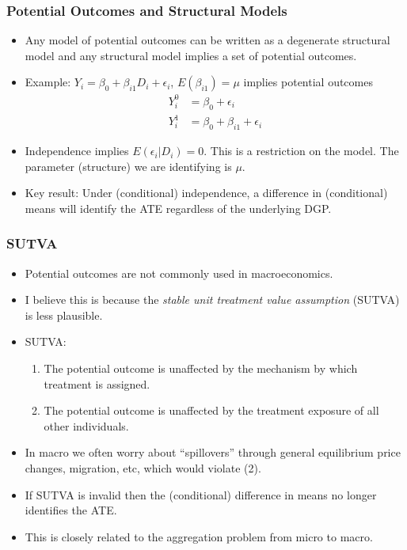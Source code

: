 \documentclass[english,xcolor=svgnames]{beamer}
\begin{document}
\begin{frame}
\frametitle[alignment=center]{Potential Outcomes and Structural Models}
\begin{itemize}
	\item Any model of potential outcomes can be written as a degenerate structural model and any structural model implies a set of potential outcomes.
	\item Example: $Y_i = \beta_0 + \beta_{i1} D_i + \epsilon_i$, $E(\beta_{i1})=\mu$ implies potential outcomes
	\begin{align*}
		Y_i^0 &= \beta_0 + \epsilon_i \\
		Y_i^1 &= \beta_0 + \beta_{i1} + \epsilon_i 
	\end{align*}
	\item Independence implies $E(\epsilon_i | D_i)=0$. This is a restriction on the model. The parameter (structure) we are identifying is $\mu$.
	\item Key result: Under (conditional) independence, a difference in (conditional) means will identify the ATE regardless of the underlying DGP.
\end{itemize}
\end{frame}

\begin{frame}
\frametitle[alignment=center]{SUTVA}
\begin{itemize}
	\item Potential outcomes are  not commonly used in macroeconomics.
	\item I believe this is because the \emph{stable unit treatment value assumption} (SUTVA) is less plausible.
	\item SUTVA: 
	\begin{enumerate}
		\item The potential outcome is unaffected by the mechanism by which treatment is assigned.
		\item The potential outcome is unaffected by the treatment exposure of all other individuals.
	\end{enumerate}
	\item In macro we often worry about ``spillovers'' through general equilibrium price changes, migration, etc, which would violate (2).
	\item If SUTVA is invalid then the (conditional) difference in means no longer identifies the ATE.
	\item This is closely related to the aggregation problem from micro to macro.
\end{itemize}
\end{frame}
\end{document}
